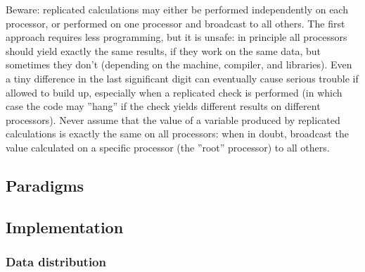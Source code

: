 \documentclass[12pt,a4paper]{article}
\begin{document}
Beware: replicated calculations may either be performed independently on each processor, or performed on one processor and broadcast to all
others. The first approach requires less programming, but it is unsafe: in principle all processors should yield exactly the same results, if they work on the same data, but sometimes they don't (depending on the machine, compiler, and libraries). Even a tiny difference in the last significant digit can eventually cause serious trouble if allowed to build up, especially when a replicated check is performed (in which
case the code may ''hang'' if the check yields different results on different processors). Never assume that the value of a variable produced by replicated calculations is exactly the same on all processors: when in doubt, broadcast the value calculated on a specific processor (the ''root'' processor) to all others.

\subsection{Paradigms}
\subsection{Implementation}
\subsubsection{ Data distribution}
\end{document}
